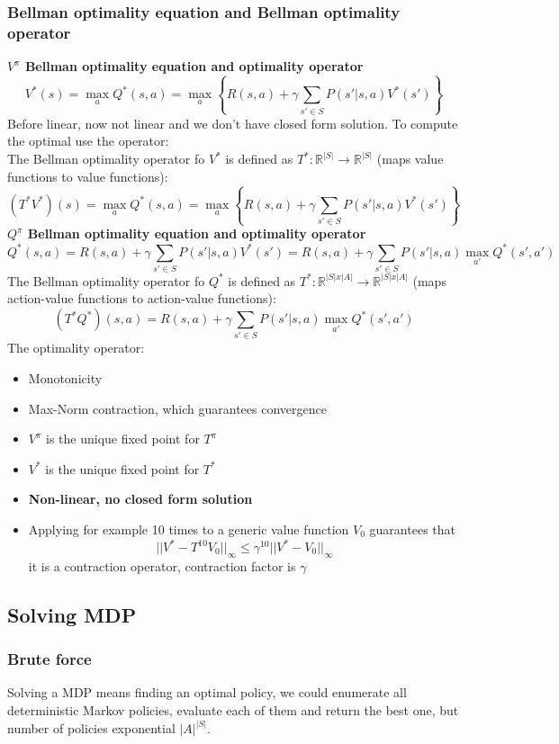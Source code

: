 \subsubsection{Bellman optimality equation and Bellman optimality operator}
    \textbf{$V^\pi$ Bellman optimality equation and optimality operator}
    $$V^*(s)=\max_aQ^*(s,a)=\max_a\left\{R(s,a)+\gamma\sum_{s' \in S}P(s'|s,a)V^*(s')\right\}$$
    Before linear, now not linear and we don't have closed form solution. To compute the optimal use the operator:\\
    The Bellman optimality operator fo $V^*$ is defined as $T^*:\mathbb{R}^{|S|}\rightarrow\mathbb{R}^{|S|}$ (maps value functions to value functions):
    $$(T^*V^*)(s)=\max_aQ^*(s,a)=\max_a\left\{R(s,a)+\gamma\sum_{s' \in S}P(s'|s,a)V^*(s')\right\}$$
    \textbf{$Q^\pi$ Bellman optimality equation and optimality operator}
    $$Q^*(s,a)=R(s,a)+\gamma\sum_{s' \in S}P(s'|s,a)V^*(s')=R(s,a)+\gamma\sum_{s' \in S}P(s'|s,a)\max_{a'}Q^*(s',a')$$
    The Bellman optimality operator fo $Q^*$ is defined as $T^*:\mathbb{R}^{|S|x|A|}\rightarrow\mathbb{R}^{|S|x|A|}$ (maps action-value functions to action-value functions):
    $$(T^*Q^*)(s,a)=R(s,a)+\gamma\sum_{s' \in S}P(s'|s,a)\max_{a'}Q^*(s',a')$$
    The optimality operator:
    \begin{itemize}
        \item Monotonicity
        \item Max-Norm contraction, which guarantees convergence
        \item $V^\pi$ is the unique fixed point for $T^\pi$
        \item $V^*$ is the unique fixed point for $T^*$
        \item \textbf{Non-linear, no closed form solution}
        \item Applying for example 10 times to a generic value function $V_0$ guarantees that
        $$||V^*-T^{10}V_0||_\infty\leq\gamma^{10}||V^*-V_0||_\infty$$
        it is a contraction operator, contraction factor is $\gamma$
    \end{itemize}

\subsection{Solving MDP}
\subsubsection{Brute force}
    Solving a MDP means finding an optimal policy, we could enumerate all deterministic Markov policies, evaluate each of them and return the best one, but number of policies exponential $|A|^{|S|}$.
